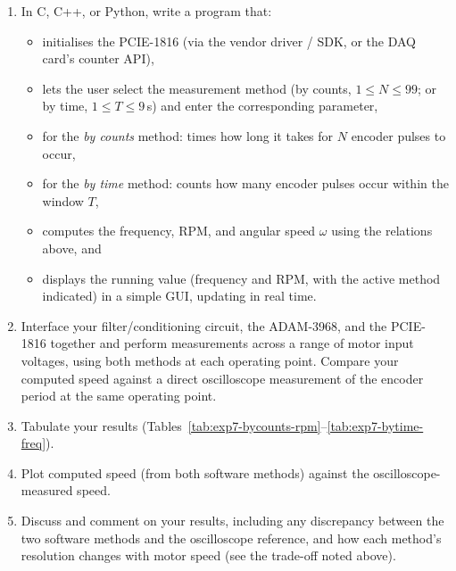 \begin{procedure}
  \begin{enumerate}
    \item In C, C++, or Python, write a program that:
          \begin{itemize}
            \item initialises the PCIE-1816 (via the vendor driver / SDK, or the DAQ card's counter API),
            \item lets the user select the measurement method (by counts, $1 \leq N \leq 99$; or by time, $1 \leq T \leq 9$\,s) and enter the corresponding parameter, \newpage
            \item for the \emph{by counts} method: times how long it takes for $N$ encoder pulses to occur,
            \item for the \emph{by time} method: counts how many encoder pulses occur within the window $T$,
            \item computes the frequency, RPM, and angular speed $\omega$ using the relations above, and
            \item displays the running value (frequency and RPM, with the active method indicated) in a simple GUI, updating in real time.
          \end{itemize}
    \item Interface your filter/conditioning circuit, the ADAM-3968, and the PCIE-1816 together and perform measurements across a range of motor input voltages, using both methods at each operating point. Compare your computed speed against a direct oscilloscope measurement of the encoder period at the same operating point.
    \item Tabulate your results (Tables~\ref{tab:exp7-bycounts-rpm}--\ref{tab:exp7-bytime-freq}).
    \item Plot computed speed (from both software methods) against the oscilloscope-measured speed.
    \item Discuss and comment on your results, including any discrepancy between the two software methods and the oscilloscope reference, and how each method's resolution changes with motor speed (see the trade-off noted above).
  \end{enumerate}


\end{procedure}
